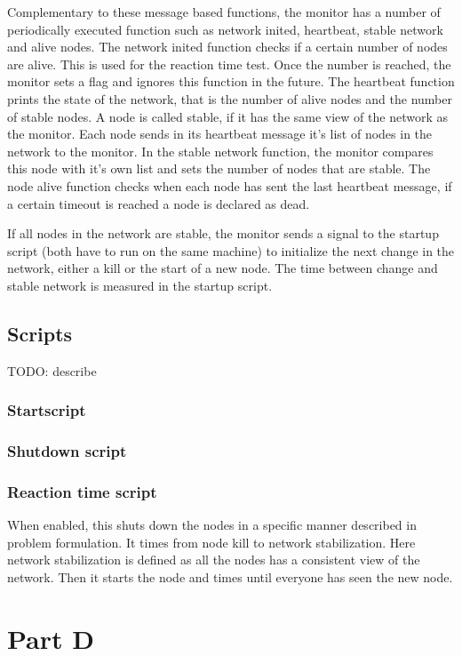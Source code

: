 \documentclass[paper=a4, fontsize=11pt]{scrartcl} %
\numberwithin{equation}{section} %
\numberwithin{figure}{section} %
\numberwithin{table}{section} %
\begin{document}
Complementary to these message based functions, the monitor has a number of periodically executed function such as network inited, heartbeat, stable network and alive nodes. The network inited function checks if a certain number of nodes are alive. This is used for the reaction time test. Once the number is reached, the monitor sets a flag and ignores this function in the future. The heartbeat function prints the state of the network, that is the number of alive nodes and the number of stable nodes. A node is called stable, if it has the same view of the network as the monitor. Each node sends in its heartbeat message it's list of nodes in the network to the monitor. In the stable network function, the monitor compares this node with it's own list and sets the number of nodes that are stable. The node alive function checks when each node has sent the last heartbeat message, if a certain timeout is reached a node is declared as dead.

If all nodes in the network are stable, the monitor sends a signal to the startup script (both have to run on the same machine) to initialize the next change in the network, either a kill or the start of a new node. The time between change and stable network is measured in the startup script.

\subsection{Scripts}

TODO: describe

\subsubsection{Startscript}

\subsubsection{Shutdown script}

\subsubsection{Reaction time script}
When enabled, this shuts down the nodes in a specific manner described in problem formulation. It times from node kill to network stabilization. Here network stabilization is defined as all the nodes has a consistent view of the network. Then it starts the node and times until everyone has seen the new node.
\section{Part D}
\end{document}
